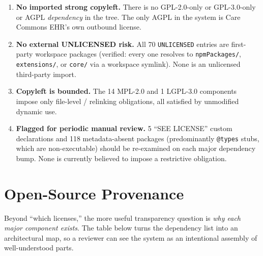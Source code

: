 \begin{enumerate}
\item \textbf{No imported strong copyleft.} There is no GPL-2.0-only or
  GPL-3.0-only or AGPL \emph{dependency} in the tree. The only AGPL in the
  system is Care Commons EHR's own outbound license.
\item \textbf{No external UNLICENSED risk.} All 70 \texttt{UNLICENSED}
  entries are first-party workspace packages (verified: every one resolves
  to \texttt{npmPackages/}, \texttt{extensions/}, or \texttt{core/} via a
  workspace symlink). None is an unlicensed third-party import.
\item \textbf{Copyleft is bounded.} The 14 MPL-2.0 and 1 LGPL-3.0 components
  impose only file-level / relinking obligations, all satisfied by unmodified
  dynamic use.
\item \textbf{Flagged for periodic manual review.} 5 ``SEE LICENSE'' custom
  declarations and 118 metadata-absent packages (predominantly
  \texttt{@types} stubs, which are non-executable) should be re-examined on
  each major dependency bump. None is currently believed to impose a
  restrictive obligation.
\end{enumerate}

\section{Open-Source Provenance}

Beyond ``which licenses,'' the more useful transparency question is
\emph{why each major component exists}. The table below turns the dependency
list into an architectural map, so a reviewer can see the system as an
intentional assembly of well-understood parts.

